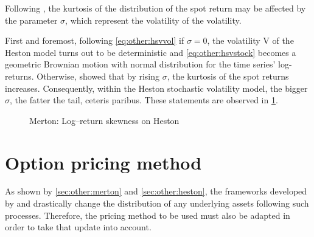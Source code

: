 \documentclass[12pt]{report}
\begin{document}
Following \citet{heston1993}, the kurtosis of the distribution of the spot return may be affected by the parameter $\sigma$, which represent the volatility of the volatility.

First and foremost, following \cref{eq:other:hsvvol} if $\sigma = 0$, the volatility V of the Heston model turns out to be deterministic and \cref{eq:other:hsvstock}  becomes a geometric Brownian motion with normal distribution for the time series' log-returns.
Otherwise, \citet{heston1993} showed that by rising $\sigma$, the kurtosis of the spot returns increases. Consequently, within the Heston stochastic volatility model, the bigger $\sigma$, the fatter the tail, ceteris paribus. These statements are observed in \cref{p:other:heston:kurtosis}.

\begin{figure}[H]
\centering

\caption{Merton: Log--return skewness on Heston}
\label{p:other:heston:kurtosis}
\end{figure}




\section{Option pricing method}
\label{sec:other:option}

As shown by \cref{sec:other:merton} and \cref{sec:other:heston}, the frameworks developed by \citet{merton76} and \citet{heston1993} drastically change the distribution of any underlying assets following such processes. Therefore, the pricing method to be used must also be adapted in order to take that update into account.
\end{document}
